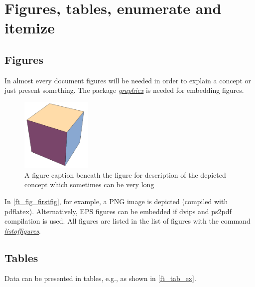 \documentclass[a4paper,11pt,oneside]{book}
\newcommand{\imp}[1]{\underline{\textit{#1}}}
\begin{document}

\chapter{Figures, tables, enumerate and itemize}


\section{Figures}

In almost every document figures will be needed in order to explain a concept or just present something. The package \imp{graphicx} is needed for embedding figures.

\begin{figure}[!h]
	\centering
	\includegraphics[width=0.3\textwidth]{figures/cube}
	\caption{A figure caption beneath the figure for description of the depicted concept which sometimes can be very long}
	\label{ft_fig_firstfig}
\end{figure}

In \autoref{ft_fig_firstfig}, for example, a PNG image is depicted (compiled with pdflatex). Alternatively, EPS figures can be embedded if dvips and ps2pdf compilation is used. All figures are listed in the list of figures with the command \imp{listoffigures}.


\section{Tables}

Data can be presented in tables, e.g., as shown in \autoref{ft_tab_ex}.
\end{document}
